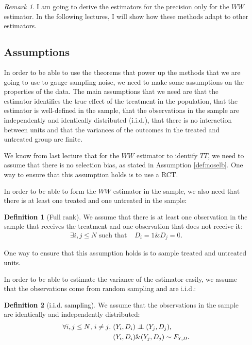\documentclass[
]{book}
\newcommand\Ind{\protect\mathpalette{\protect\independenT}{\perp}}
\def\independenT#1#2{\mathrel{\setbox0\hbox{$#1#2$}\copy0\kern-\wd0\mkern4mu\box0}}
\theoremstyle{definition}
\newtheorem{definition}{Definition}[chapter]
\theoremstyle{definition}
\theoremstyle{definition}
\theoremstyle{definition}
\theoremstyle{remark}
\newtheorem*{remark}{Remark}
\begin{document}
\begin{remark}
\iffalse{} {Remark. } \fi{}I am going to derive the estimators for the precision only for the \(WW\) estimator.
In the following lectures, I will show how these methods adapt to other estimators.
\end{remark}

\hypertarget{sec:assumptions}{%
\subsection{Assumptions}\label{sec:assumptions}}

In order to be able to use the theorems that power up the methods that we are going to use to gauge sampling noise, we need to make some assumptions on the properties of the data.
The main assumptions that we need are that the estimator identifies the true effect of the treatment in the population, that the estimator is well-defined in the sample, that the observations in the sample are independently and identically distributed (i.i.d.), that there is no interaction between units and that the variances of the outcomes in the treated and untreated group are finite.

We know from last lecture that for the \(WW\) estimator to identify \(TT\), we need to assume that there is no selection bias, as stated in Assumption \ref{def:noselb}.
One way to ensure that this assumption holds is to use a RCT.

In order to be able to form the \(WW\) estimator in the sample, we also need that there is at least one treated and one untreated in the sample:

\begin{definition}[Full rank]
\protect\hypertarget{def:fullrank}{}{\label{def:fullrank} \iffalse (Full rank) \fi{} }We assume that there is at least one observation in the sample that receives the treatment and one observation that does not receive it:
\begin{align*}
\exists i,j\leq N \text{ such that } & D_i=1 \& D_j=0.
\end{align*}
\end{definition}

One way to ensure that this assumption holds is to sample treated and untreated units.

In order to be able to estimate the variance of the estimator easily, we assume that the observations come from random sampling and are i.i.d.:

\begin{definition}[i.i.d. sampling]
\protect\hypertarget{def:iid}{}{\label{def:iid} \iffalse (i.i.d. sampling) \fi{} }We assume that the observations in the sample are identically and independently distributed:
\begin{align*}
\forall i,j\leq N\text{, }i\neq j\text{, } & (Y_i,D_i)\Ind(Y_j,D_j),\\
                                           & (Y_i,D_i)\&(Y_j,D_j)\sim F_{Y,D}.
\end{align*}
\end{definition}
\end{document}
